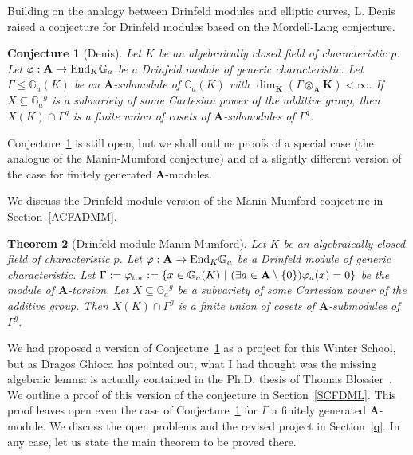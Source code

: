 \documentclass{amsart}
\newcommand{\Ga}{{{\mathbb G}_a}}
\newtheorem{thm}{Theorem}[section]
\newtheorem{conj}[thm]{Conjecture}
\theoremstyle{definition}
\theoremstyle{remark}
\begin{document}
Building on the analogy between Drinfeld modules and elliptic curves,
L. Denis raised a conjecture for Drinfeld modules based
on the Mordell-Lang conjecture. 

\begin{conj}[Denis]
\label{DMLc}
Let $K$ be an algebraically closed field of characteristic $p$.
Let $\varphi:{\mathbf A} \to  {\rm End}_K \Ga$ be a Drinfeld module of
generic characteristic.   Let $\Gamma \leq \Ga(K)$ be an ${\mathbf A}$-submodule 
of $\Ga(K)$ with $\dim_{\mathbf K} (\Gamma \otimes_{\mathbf A} {\mathbf K}) < \infty$.
If $X \subseteq \Ga^g$ is a subvariety of some Cartesian power of the additive
group, then $X(K) \cap \Gamma^g$ is a finite union of cosets of ${\mathbf A}$-submodules
of $\Gamma^g$.
\end{conj}


Conjecture~\ref{DMLc} is still open, but we shall outline proofs of a special case (the 
analogue of the Manin-Mumford conjecture) and of a slightly different version of the 
case for finitely generated ${\mathbf A}$-modules.

We discuss the Drinfeld module version of the Manin-Mumford conjecture in Section~\ref{ACFADMM}.

\begin{thm}[Drinfeld module Manin-Mumford]
\label{DMMM}
Let $K$ be an algebraically closed field of characteristic $p$.
Let $\varphi:{\mathbf A} \to {\rm End}_K \Ga$ be a Drinfeld module of 
generic characteristic.  Let $\Gamma := \varphi_{\rm tor} := \{ x \in \Ga(K) \ \vert \
 (\exists a \in {\mathbf A} \setminus \{ 0 \}) \varphi_a(x) = 0 \}$ be the 
module of ${\mathbf A}$-torsion.  Let $X \subseteq \Ga^g$ be a subvariety of 
some Cartesian power of the additive group.  Then $X(K) \cap \Gamma^g$ 
is a finite union of cosets of ${\mathbf A}$-submodules of $\Gamma^g$.
\end{thm}


We had proposed a version of Conjecture~\ref{DMLc} as a project for this Winter School, but
as Dragos Ghioca has pointed out, what I had thought was the missing algebraic lemma is actually
contained in the Ph.D. thesis of Thomas Blossier~\cite{Blossier}.  We outline a proof of this 
version of the conjecture in Section~\ref{SCFDML}.  This proof leaves open even the case
of Conjecture~\ref{DMLc} for $\Gamma$ a finitely generated ${\mathbf A}$-module.  We discuss the 
open problems and the revised project in Section~\ref{q}.  In any case, let us state the main theorem 
to be proved there.
\end{document}
